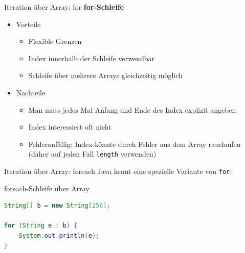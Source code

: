 \documentclass[18pt]{beamer}
\begin{document}
\begin{frame}{Iteration über Array: for}
    \textbf{for-Schleife}
    \begin{itemize}
        \item Vorteile
        \begin{itemize}
            \item Flexible Grenzen
            \item Index innerhalb der Schleife verwendbar
            \item Schleife über mehrere Arrays gleichzeitig möglich

        \end{itemize}
        \pause
        \item Nachteile
        \begin{itemize}
            \item Man muss jedes Mal Anfang und Ende des Index explizit angeben
            \item Index interessiert oft nicht
            \item Fehleranfällig: Index könnte durch Fehler aus dem Array rauslaufen (daher auf jeden Fall \texttt{length} verwenden)
        \end{itemize}
    \end{itemize}
\end{frame}

\begin{frame}[fragile]{Iteration über Array: foreach}
    Java kennt eine spezielle Variante von \texttt{for}:\\


    \begin{exampleblock}{foreach-Schleife über Array}
        \begin{lstlisting}[language=Java]
String[] b = new String[256];

for (String e : b) {
    System.out.println(e);
}
        \end{lstlisting}

    \end{exampleblock}
\end{frame}
\end{document}
